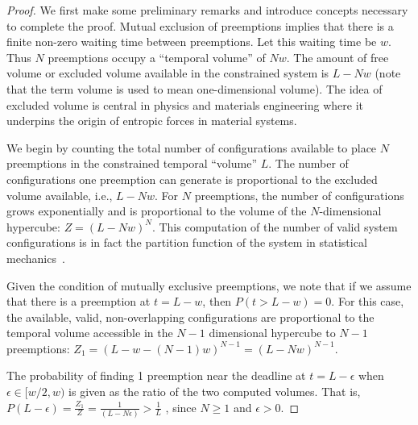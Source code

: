 \begin{proof}
We first make some preliminary remarks and introduce concepts necessary to complete the proof.
Mutual exclusion of preemptions implies that there is a finite non-zero waiting time between preemptions. Let this waiting time be $w$.
Thus $N$ preemptions occupy a ``temporal volume'' of $Nw$.
The amount of free volume or excluded volume available in the constrained system is $L - Nw$ (note that the term volume is used to mean one-dimensional volume).
The idea of excluded volume is central in physics and materials engineering where it underpins the origin of entropic forces in material systems. 

We begin by counting the total number of configurations available to place $N$ preemptions in the constrained temporal ``volume'' $L$. 
The number of configurations one preemption can generate is proportional to the excluded volume available, i.e., $L-Nw$.
For $N$ preemptions, the number of configurations grows exponentially and is proportional to the volume of the $N$-dimensional hypercube: $Z = (L-Nw)^N$. 
This computation of the number of valid system configurations is in fact the partition function of the system in statistical mechanics~\cite{kreuth}. 

Given the condition of mutually exclusive preemptions, we note that if we assume that there is a preemption at $t=L-w$, then $P(t> L-w) = 0$.
For this case, the available, valid, non-overlapping configurations are proportional to the temporal volume accessible in the $N-1$ dimensional hypercube to $N-1$ preemptions: $Z_{1} = (L-w-(N-1)w)^{N-1} = (L-Nw)^{N-1}$. 

The probability of finding 1 preemption near the deadline at $t=L-\epsilon$ when $\epsilon \in [w/2, w)$ is given as the ratio of the two computed volumes.
That is, $P(L-\epsilon) = \frac{Z_1}{Z} = \frac{1}{(L - N\epsilon)} > \frac{1}{L}$ , since $N \geq 1$ and $\epsilon>0$. 



\end{proof}


